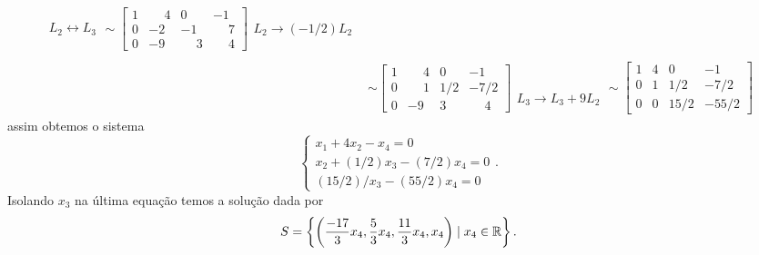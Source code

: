 \begin{exemplo}
\begin{enumerate}[label={\arabic*})]
\begin{align*}
				\begin{array}{l}
					\phantom{x}\\
					L_2 \leftrightarrow L_3\\
					\phantom{x}
				\end{array} \sim
				\left[
					\begin{array}{cccc}
						1 & \phantom{-}4 & 0 & -1\\
						0 & -2 & -1 & \phantom{-}7\\
						0 & -9 & \phantom{-}3 & \phantom{-}4
					\end{array}
				\right]
				\begin{array}{l}
					\phantom{x}\\
					L_2 \to (-1/2)L_2\\
					\phantom{x}
				\end{array}\\ \\ &\sim
				\left[
					\begin{array}{cccc}
						1 & \phantom{-}4 & 0 & -1\\
						0 & \phantom{-}1 & 1/2 & -7/2\\
						0 & -9 & 3 & \phantom{-}4
					\end{array}
				\right]
				\begin{array}{l}
					\phantom{x}\\
					\phantom{x}\\
					L_3 \to L_3 + 9L_2
				\end{array} \sim
				\left[
					\begin{array}{cccc}
						1 & 4 & 0 & -1\\
						0 & 1 & 1/2 & -7/2\\
						0 & 0 & 15/2 & -55/2
					\end{array}
				\right]
		\end{align*}
		assim obtemos o sistema
		\[
			\begin{cases}
				x_1 + 4x_2 - x_4 = 0\\
				x_2 + (1/2)x_3 - (7/2)x_4 = 0\\
				(15/2)/x_3 - (55/2)x_4 = 0
			\end{cases}.
		\]
		Isolando $x_3$ na \'ultima equa\c{c}\~ao temos a solu\c{c}\~ao dada por
		\[
			S = \left\{\left(\dfrac{-17}{3}x_4, \dfrac{5}{3}x_4, \dfrac{11}{3}x_4, x_4\right) \mid x_4 \in \mathbb{R}\right\}.
		\]


\end{enumerate}
\end{exemplo}
